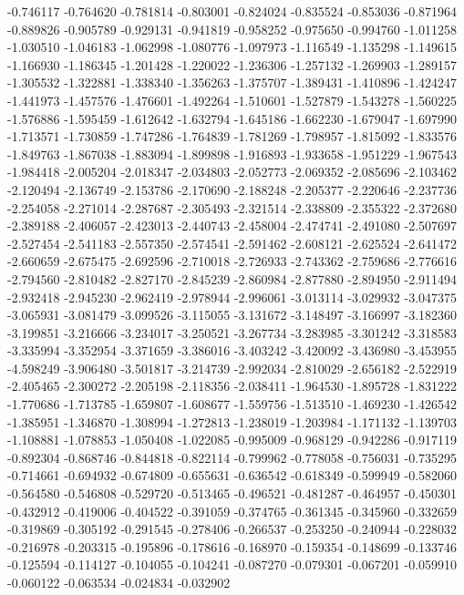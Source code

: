 -0.746117
-0.764620
-0.781814
-0.803001
-0.824024
-0.835524
-0.853036
-0.871964
-0.889826
-0.905789
-0.929131
-0.941819
-0.958252
-0.975650
-0.994760
-1.011258
-1.030510
-1.046183
-1.062998
-1.080776
-1.097973
-1.116549
-1.135298
-1.149615
-1.166930
-1.186345
-1.201428
-1.220022
-1.236306
-1.257132
-1.269903
-1.289157
-1.305532
-1.322881
-1.338340
-1.356263
-1.375707
-1.389431
-1.410896
-1.424247
-1.441973
-1.457576
-1.476601
-1.492264
-1.510601
-1.527879
-1.543278
-1.560225
-1.576886
-1.595459
-1.612642
-1.632794
-1.645186
-1.662230
-1.679047
-1.697990
-1.713571
-1.730859
-1.747286
-1.764839
-1.781269
-1.798957
-1.815092
-1.833576
-1.849763
-1.867038
-1.883094
-1.899898
-1.916893
-1.933658
-1.951229
-1.967543
-1.984418
-2.005204
-2.018347
-2.034803
-2.052773
-2.069352
-2.085696
-2.103462
-2.120494
-2.136749
-2.153786
-2.170690
-2.188248
-2.205377
-2.220646
-2.237736
-2.254058
-2.271014
-2.287687
-2.305493
-2.321514
-2.338809
-2.355322
-2.372680
-2.389188
-2.406057
-2.423013
-2.440743
-2.458004
-2.474741
-2.491080
-2.507697
-2.527454
-2.541183
-2.557350
-2.574541
-2.591462
-2.608121
-2.625524
-2.641472
-2.660659
-2.675475
-2.692596
-2.710018
-2.726933
-2.743362
-2.759686
-2.776616
-2.794560
-2.810482
-2.827170
-2.845239
-2.860984
-2.877880
-2.894950
-2.911494
-2.932418
-2.945230
-2.962419
-2.978944
-2.996061
-3.013114
-3.029932
-3.047375
-3.065931
-3.081479
-3.099526
-3.115055
-3.131672
-3.148497
-3.166997
-3.182360
-3.199851
-3.216666
-3.234017
-3.250521
-3.267734
-3.283985
-3.301242
-3.318583
-3.335994
-3.352954
-3.371659
-3.386016
-3.403242
-3.420092
-3.436980
-3.453955
-4.598249
-3.906480
-3.501817
-3.214739
-2.992034
-2.810029
-2.656182
-2.522919
-2.405465
-2.300272
-2.205198
-2.118356
-2.038411
-1.964530
-1.895728
-1.831222
-1.770686
-1.713785
-1.659807
-1.608677
-1.559756
-1.513510
-1.469230
-1.426542
-1.385951
-1.346870
-1.308994
-1.272813
-1.238019
-1.203984
-1.171132
-1.139703
-1.108881
-1.078853
-1.050408
-1.022085
-0.995009
-0.968129
-0.942286
-0.917119
-0.892304
-0.868746
-0.844818
-0.822114
-0.799962
-0.778058
-0.756031
-0.735295
-0.714661
-0.694932
-0.674809
-0.655631
-0.636542
-0.618349
-0.599949
-0.582060
-0.564580
-0.546808
-0.529720
-0.513465
-0.496521
-0.481287
-0.464957
-0.450301
-0.432912
-0.419006
-0.404522
-0.391059
-0.374765
-0.361345
-0.345960
-0.332659
-0.319869
-0.305192
-0.291545
-0.278406
-0.266537
-0.253250
-0.240944
-0.228032
-0.216978
-0.203315
-0.195896
-0.178616
-0.168970
-0.159354
-0.148699
-0.133746
-0.125594
-0.114127
-0.104055
-0.104241
-0.087270
-0.079301
-0.067201
-0.059910
-0.060122
-0.063534
-0.024834
-0.032902
